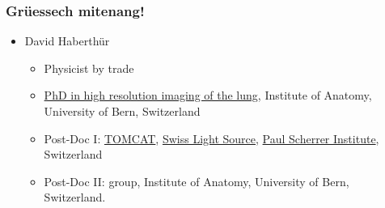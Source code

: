 \makeatletter
{}%
\DeclareCiteCommand{\hypercite}%
	{}%
	{}%
	{}%
	{}%
\renewcommand{\footcite}[1]{\cite{#1}\hypercite{#1}}
\makeatother



\begin{frame}
	\maketitle
\end{frame}

\begin{frame}
	\frametitle{Grüessech mitenang!}
	\begin{itemize}
		\item David Haberthür
		\begin{itemize}
			\item Physicist by trade
			\item \href{https://boris.unibe.ch/2619/}{PhD in high resolution imaging of the lung}, Institute of Anatomy, University of Bern, Switzerland
			\item Post-Doc I: \href{https://www.psi.ch/sls/tomcat/}{TOMCAT}, \href{https://www.psi.ch/sls/}{Swiss Light Source}, \href{https://www.psi.ch/}{Paul Scherrer Institute}, Switzerland
			\item Post-Doc II: \uct group, Institute of Anatomy, University of Bern, Switzerland.
		\end{itemize}
	\end{itemize}
\end{frame}

